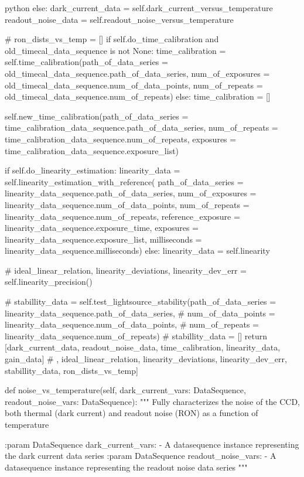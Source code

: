 \documentclass[../main.tex]{subfiles}
\begin{document}
\begin{mintedbox}{python}
else:
dark_current_data  =  self.dark_current_versus_temperature
readout_noise_data  =  self.readout_noise_versus_temperature

# ron_dists_vs_temp  =  []
if self.do_time_calibration and old_timecal_data_sequence is not None:
time_calibration  =  self.time_calibration(path_of_data_series = old_timecal_data_sequence.path_of_data_series,
num_of_exposures = old_timecal_data_sequence.num_of_data_points,
num_of_repeats = old_timecal_data_sequence.num_of_repeats)
else:
time_calibration  =  []

self.new_time_calibration(path_of_data_series = time_calibration_data_sequence.path_of_data_series,
num_of_repeats = time_calibration_data_sequence.num_of_repeats,
exposures = time_calibration_data_sequence.exposure_list)

if self.do_linearity_estimation:
linearity_data  =  self.linearity_estimation_with_reference(
path_of_data_series = linearity_data_sequence.path_of_data_series,
num_of_exposures = linearity_data_sequence.num_of_data_points,
num_of_repeats = linearity_data_sequence.num_of_repeats,
reference_exposure = linearity_data_sequence.exposure_time,
exposures = linearity_data_sequence.exposure_list,
milliseconds = linearity_data_sequence.milliseconds)
else:
linearity_data  =  self.linearity

# ideal_linear_relation, linearity_deviations, linearity_dev_err  =  self.linearity_precision()

# stabillity_data  =  self.test_lightsource_stability(path_of_data_series   =    linearity_data_sequence.path_of_data_series,
#                                                   num_of_data_points    =    linearity_data_sequence.num_of_data_points,
#                                                   num_of_repeats        =    linearity_data_sequence.num_of_repeats)
# stabillity_data  =  []
return [dark_current_data, readout_noise_data, time_calibration, linearity_data, gain_data]
# , ideal_linear_relation, linearity_deviations, linearity_dev_err, stabillity_data, ron_dists_vs_temp]

def noise_vs_temperature(self, dark_current_vars: DataSequence, readout_noise_vars: DataSequence):
"""
Fully characterizes the noise of the CCD, both thermal (dark current) and
readout noise (RON) as a function of temperature

:param DataSequence dark_current_vars:
- A datasequence instance representing the dark current data series
:param DataSequence readout_noise_vars:
- A datasequence instance representing the readout noise data series
"""


\end{mintedbox}
\end{document}
